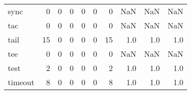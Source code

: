 \begin{tabular}{lrrrrrrrrr}
sync      &                                                  0 &                                                  0 &                                                  0 &                                                  0 &                                                  0 &                                                  0 &                                                NaN &                                    NaN &                                  NaN \\
tac       &                                                  0 &                                                  0 &                                                  0 &                                                  0 &                                                  0 &                                                  0 &                                                NaN &                                    NaN &                                  NaN \\
tail      &                                                 15 &                                                  0 &                                                  0 &                                                  0 &                                                  0 &                                                 15 &                                                1.0 &                                    1.0 &                                  1.0 \\
tee       &                                                  0 &                                                  0 &                                                  0 &                                                  0 &                                                  0 &                                                  0 &                                                NaN &                                    NaN &                                  NaN \\
test      &                                                  2 &                                                  0 &                                                  0 &                                                  0 &                                                  0 &                                                  2 &                                                1.0 &                                    1.0 &                                  1.0 \\
timeout   &                                                  8 &                                                  0 &                                                  0 &                                                  0 &                                                  0 &                                                  8 &                                                1.0 &                                    1.0 &                                  1.0 \\

\end{tabular}
